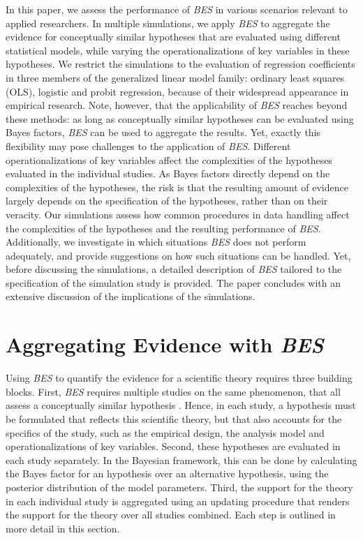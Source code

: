 \documentclass[
  authoryear,
  preprint,
  5p,
  twocolumn]{elsarticle}
\begin{document}
In this paper, we assess the performance of \emph{BES} in various
scenarios relevant to applied researchers. In multiple simulations, we
apply \emph{BES} to aggregate the evidence for conceptually similar
hypotheses that are evaluated using different statistical models, while
varying the operationalizations of key variables in these hypotheses. We
restrict the simulations to the evaluation of regression coefficients in
three members of the generalized linear model family: ordinary least
squares (OLS), logistic and probit regression, because of their
widespread appearance in empirical research. Note, however, that the
applicability of \emph{BES} reaches beyond these methods: as long as
conceptually similar hypotheses can be evaluated using Bayes factors,
\emph{BES} can be used to aggregate the results. Yet, exactly this
flexibility may pose challenges to the application of \emph{BES}.
Different operationalizations of key variables affect the complexities
of the hypotheses evaluated in the individual studies. As Bayes factors
directly depend on the complexities of the hypotheses, the risk is that
the resulting amount of evidence largely depends on the specification of
the hypotheses, rather than on their veracity. Our simulations assess
how common procedures in data handling affect the complexities of the
hypotheses and the resulting performance of \emph{BES}. Additionally, we
investigate in which situations \emph{BES} does not perform adequately,
and provide suggestions on how such situations can be handled. Yet,
before discussing the simulations, a detailed description of \emph{BES}
tailored to the specification of the simulation study is provided. The
paper concludes with an extensive discussion of the implications of the
simulations.

\hypertarget{aggregating-evidence-with-bes}{%
\section{\texorpdfstring{Aggregating Evidence with
\emph{BES}}{Aggregating Evidence with BES}}\label{aggregating-evidence-with-bes}}

Using \emph{BES} to quantify the evidence for a scientific theory
requires three building blocks. First, \emph{BES} requires multiple
studies on the same phenomenon, that all assess a conceptually similar
hypothesis \citep{kuiper_combining_2013}. Hence, in each study, a
hypothesis must be formulated that reflects this scientific theory, but
that also accounts for the specifics of the study, such as the empirical
design, the analysis model and operationalizations of key variables.
Second, these hypotheses are evaluated in each study separately. In the
Bayesian framework, this can be done by calculating the Bayes factor for
an hypothesis over an alternative hypothesis, using the posterior
distribution of the model parameters. Third, the support for the theory
in each individual study is aggregated using an updating procedure that
renders the support for the theory over all studies combined. Each step
is outlined in more detail in this section.
\end{document}
